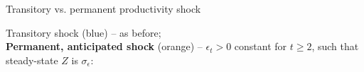 \documentclass{beamer}
\begin{document}
\begin{frame}{Transitory vs. permanent productivity shock}

  Transitory shock (blue) -- as before; \\ \textbf{Permanent, anticipated shock} (orange) -- $\epsilon_t > 0$ constant for $t \geq 2$, such that steady-state $Z$ is $\sigma_\epsilon$:
\begin{center}
\vspace{-5mm}
\begin{figure}[h!]
\end{figure}
\end{center}
%
\end{frame}

\end{document}
